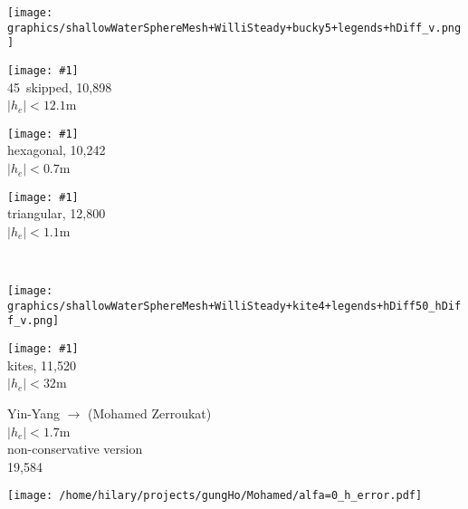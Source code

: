 \begin{slide}

\newcommand{\figWidth}{0.3\linewidth}
\raggedright

\newcommand{\subfig}[4]{
\begin{minipage}{\figWidth}\centering
\texttt{[image: \#1]}\\
#2 \\ \small $|h_e|\lt #3$m%
\end{minipage}
}

\begin{minipage}{0.04\linewidth}
\texttt{[image: graphics/shallowWaterSphereMesh+WilliSteady+bucky5+legends+hDiff\_v.png]}
\end{minipage}
%
\subfig{graphics/shallowWaterSphereMesh+WilliSteady+48x96_V_45+save+CN_dt1hr_midPointpv_balance+432000+hDiff.png}
{45\de\ skipped, 10,898 \dofs}{12.1}{1.6}
%
\subfig{graphics/shallowWaterSphereMesh+WilliSteady+bucky5+save+CN_dt1hr_midPointpv_balance+432000+hDiff.png}
{hexagonal, 10,242 \dofs}{0.7}{0.6}
%
\subfig{graphics/shallowWaterSphereMesh+WilliSteady+tri5+save+CN_dt1hr_midPointpv_balance+432000+hDiff.png}
{triangular, 12,800 \dofs}{1.1}{0.2}
\\
\begin{minipage}{0.04\linewidth}
\texttt{[image: graphics/shallowWaterSphereMesh+WilliSteady+kite4+legends+hDiff50\_hDiff\_v.png]}
\end{minipage}
%
\subfig{graphics/shallowWaterSphereMesh+WilliSteady+kite4+save+CN_dt1hr_midPointpv_balance+432000+hDiff50.png}
{kites, 11,520 \dofs}{32}{6.4}
%
\begin{minipage}{0.19\linewidth}
Yin-Yang $\rightarrow$ (Mohamed Zerroukat)\\
{\small $|h_e|\lt 1.7$m} \\
non-conservative version \\
19,584 \dofs
\end{minipage}
\begin{minipage}{0.4\linewidth}
\texttt{[image: /home/hilary/projects/gungHo/Mohamed/alfa=0\_h\_error.pdf]}
\end{minipage}

\end{slide}

